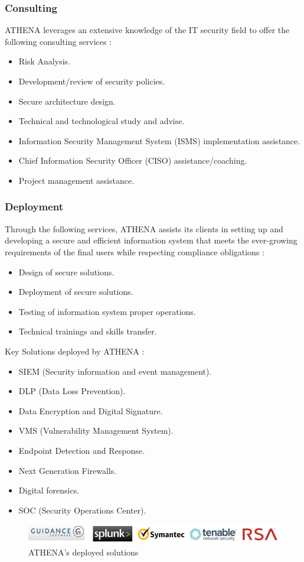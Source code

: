 \subsubsection{Consulting}

ATHENA leverages an extensive knowledge of the IT security field to offer the following consulting services :
\begin{itemize}
\item Risk Analysis.
\item Development/review of security policies.
\item Secure architecture design.
\item Technical and technological study and advise.
\item Information Security Management System (ISMS) implementation assistance.
\item Chief Information Security Officer (CISO) assistance/coaching.
\item Project management assistance.
\end{itemize}
\subsubsection{Deployment}
Through the following services, ATHENA assists its clients in setting up and developing a secure and efficient information system that meets the ever-growing requirements of the final users while respecting compliance obligations :
\begin{itemize}
\item Design of secure solutions.
\item Deployment of secure solutions.
\item Testing of information system proper operations.
\item Technical trainings and skills transfer.
\end{itemize}
Key Solutions deployed by ATHENA :
\begin{itemize}
    \item SIEM (Security information and event management).
    \item DLP (Data Loss Prevention).
    \item Data Encryption and Digital Signature.
    \item VMS (Vulnerability Management System).
    \item Endpoint Detection and Response.
    \item Next Generation Firewalls.
    \item Digital forensics.
    \item SOC (Security Operations Center).
\end{itemize}
\begin{figure}[!htpb]
\begin{center}
\includegraphics{images/ATHENAdeployment.png}
\caption{ATHENA's deployed solutions}
\label{schema}
\end{center}
\end{figure} 
